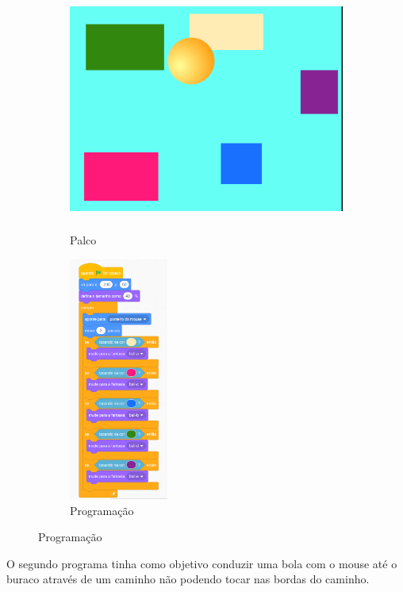 \documentclass[12pt, openright, a4paper, brazil, english, french, spanish, bibjustif, openany, oneside]{abntex2}
\begin{document}
\begin{figure}[H]

 \centering
 
         \caption{Palco e Programação da bola que muda de cor \label{rec1}}
     \begin{subfigure}[b]{0.3\textwidth}
         \centering
         \includegraphics[height=8cm]{palcorec1.png}
         \caption*{Palco}
         \label{palcorec1}
     \end{subfigure}
     \hfill
     \begin{subfigure}[b]{0.3\textwidth}
         \centering
         \includegraphics[height=8cm]{progrrec1.png}
         \caption*{Programação}
         \label{progrrec1}
     \end{subfigure}   
    
\end{figure}

O segundo programa tinha como objetivo conduzir uma bola com o mouse até o buraco através de um caminho não podendo tocar nas bordas do caminho.
\end{document}
